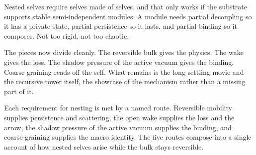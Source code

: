 Nested selves require selves made of selves, and that only works if the substrate supports stable semi-independent modules. A module needs partial decoupling so it has a private state, partial persistence so it lasts, and partial binding so it composes. Not too rigid, not too chaotic.

The pieces now divide cleanly. The reversible bulk gives the physics. The wake gives the loss. The shadow pressure of the active vacuum gives the binding. Coarse-graining reads off the self. What remains is the long settling movie and the recursive tower itself, the showcase of the mechanism rather than a missing part of it.

\begin{result}
Each requirement for nesting is met by a named route. Reversible mobility supplies persistence and scattering, the open wake supplies the loss and the arrow, the shadow pressure of the active vacuum supplies the binding, and coarse-graining supplies the macro identity. The five routes compose into a single account of how nested selves arise while the bulk stays reversible.
\end{result}
